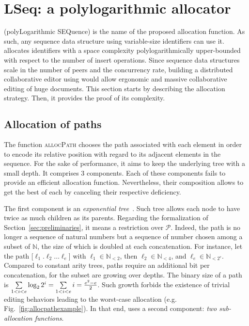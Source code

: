 

\section{LSeq: a polylogarithmic allocator}
\label{sec:proposal}

\LSEQ (polyLogarithmic SEQuence) is the name of the proposed allocation
function. As such, any sequence data structure using variable-size identifiers
can use it. \LSEQ allocates identifiers with a space complexity
polylogarithmically upper-bounded with respect to the number of insert
operations. Since sequence data structures scale in the number of peers and the
concurrency rate, building a distributed collaborative editor using \LSEQ would
allow ergonomic and massive collaborative editing of huge documents. This
section starts by describing the allocation strategy. Then, it provides the
proof of its complexity.

\subsection{Allocation of paths}
\label{subsec:lseqallocation}

The function \textsc{allocPath} chooses the path associated with each element in
order to encode its relative position with regard to its adjacent elements in
the sequence. For the sake of performance, it aims to keep the underlying tree
with a small depth. It comprises 3 components. Each of these components fails to
provide an efficient allocation function. Nevertheless, their composition allows
to get the best of each by canceling their respective deficiency.

The first component is an \emph{exponential
  tree}~\cite{andersson1996faster,andersson2007dynamic}. Such tree allows each
node to have twice as much children as its parents. Regarding the formalization
of Section~\ref{sec:preliminaries}, it means a restriction over
$\mathcal{P}$. Indeed, the path is no longer a sequence of natural numbers but a
sequence of number chosen among a subset of $\mathbb{N}$, the size of which is
doubled at each concatenation. For instance, let the path
[$\ell_1.\ell_2\ldots\ell_e$] with $\ell_1\in\mathbb{N}_{<2}$, then
$\ell_2\in \mathbb{N}_{<4}$, and $\ell_{e}\in\mathbb{N}_{<2^e}$. Compared to
constant arity trees, paths require an additional bit per concatenation, for
the subset are growing over depths. The binary size of a path is
$\sum\limits_{1<i<e}\log_2{2^i}=\sum\limits_{1<i<e}i= {e^2-e\over{2}}$.  Such
growth forbids the existence of trivial editing behaviors leading to the
worst-case allocation (e.g. Fig.~\ref{fig:allocpathexample}). In that end, \LSEQ
uses a second component: \emph{two sub-allocation functions}.

